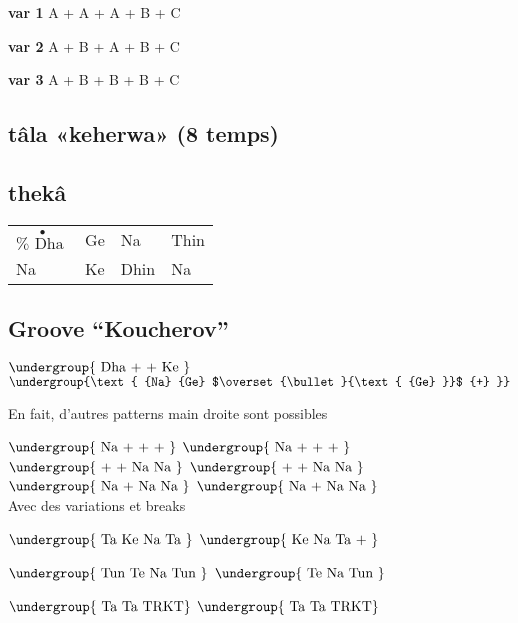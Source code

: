 \documentclass[12pt]{article}
\def\tala{tâla}
\def\theka{thekâ}
\def\keherwa{keherwa}
\newcommand{\matra}[1]{$\undergroup{\text{#1}}$}
\newcommand{\press}[1]{$\overset{\bullet}{\text{#1}}$}
\newif\ifdoigt
\newcommand{\bol}[2]{%
  \ifdoigt
  \pbox[b]{2cm}
       {\hspace*{\fill}{\scriptsize #2}\\#1}
  \else
      {#1}
  \fi
}%
\def\Go{\bol{Ge}{1}}
\def\Gd{\bol{Ge}{2}}
\def\K{\bol{Ke}{}}
\def\Tt{\bol{Te}{g3}}
\def\N{\bol{Na}{k}}
\def\Ta{\bol{Ta}{k}}
\def\Thi{\bol{Thin}{s/k}}
\def\Tu{\bol{Tun}{}}
\def\Da{\bol{Dha}{k/2}}
\def\Di{\bol{Dhin}{gsn1/2}}
\def\sepnl{\\}
\def\cont{\bol{+}{}}
\newcommand{\subtitle}[1]{%
  \begin{framed}
    \subsection*{#1}
  \end{framed}
}%
\begin{document}
\textbf{var 1}
A + A + A + B + C

\textbf{var 2}
A + B + A + B + C

\textbf{var 3}
A + B + B + B + C

\newpage
\subtitle{\tala{} «\keherwa{}» (8 temps)}

\subsection*{\theka{}}

\begin{tabular}{llll}
  \press{\Da} & \Go & \N & \Thi \\
  \N & \K & \Di & \N
\end{tabular}

\subtitle{Groove ``Koucherov''}

\matra{\Da \cont \cont \K} \matra{\N\Gd\press{\Go}\cont}

En fait, d'autres patterns main droite sont possibles

\matra{\N \cont\cont\cont} \matra{\N \cont\cont\cont} \sepnl
\matra{\cont\cont \N\N} \matra{\cont\cont \N\N} \sepnl
\matra{\N \cont \N\N} \matra{\N \cont \N\N} \sepnl

Avec des variations et breaks

\matra{\Ta \K \N \Ta} \matra{\K \N \Ta \cont}

\matra{\Tu \Tt \N \Tu} \matra{\Tt \N \Tu \tt}

\matra{\Ta \Ta TRKT} \matra{\Ta \Ta TRKT} 



\end{document}
